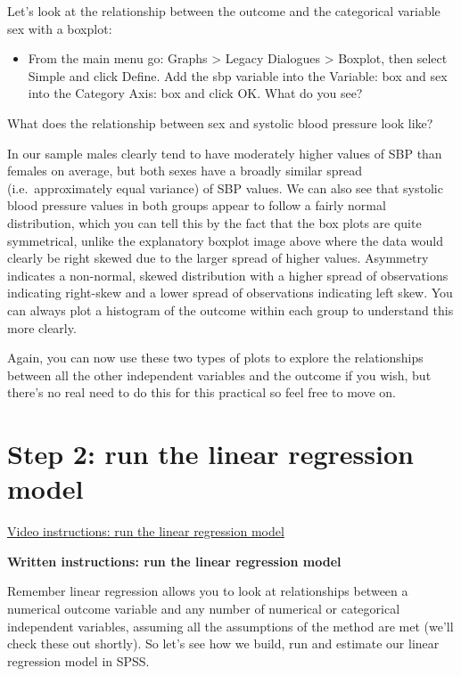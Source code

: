 \documentclass[
]{book}
\providecommand{\tightlist}{%
  \setlength{\itemsep}{0pt}\setlength{\parskip}{0pt}}
\begin{document}
Let's look at the relationship between the outcome and the categorical variable sex with a boxplot:

\begin{itemize}
\tightlist
\item
  From the main menu go: Graphs \textgreater{} Legacy Dialogues \textgreater{} Boxplot, then select Simple and click Define. Add the sbp variable into the Variable: box and sex into the Category Axis: box and click OK. What do you see?
\end{itemize}

What does the relationship between sex and systolic blood pressure look like?

In our sample males clearly tend to have moderately higher values of SBP than females on average, but both sexes have a broadly similar spread (i.e.~approximately equal variance) of SBP values. We can also see that systolic blood pressure values in both groups appear to follow a fairly normal distribution, which you can tell this by the fact that the box plots are quite symmetrical, unlike the explanatory boxplot image above where the data would clearly be right skewed due to the larger spread of higher values. Asymmetry indicates a non-normal, skewed distribution with a higher spread of observations indicating right-skew and a lower spread of observations indicating left skew. You can always plot a histogram of the outcome within each group to understand this more clearly.

Again, you can now use these two types of plots to explore the relationships between all the other independent variables and the outcome if you wish, but there's no real need to do this for this practical so feel free to move on.

\hypertarget{step-2-run-the-linear-regression-model}{%
\section{Step 2: run the linear regression model}\label{step-2-run-the-linear-regression-model}}

\href{https://youtu.be/gQRLkJNO0R0}{Video instructions: run the linear regression model}

\textbf{Written instructions: run the linear regression model}

Remember linear regression allows you to look at relationships between a numerical outcome variable and any number of numerical or categorical independent variables, assuming all the assumptions of the method are met (we'll check these out shortly). So let's see how we build, run and estimate our linear regression model in SPSS.
\end{document}
